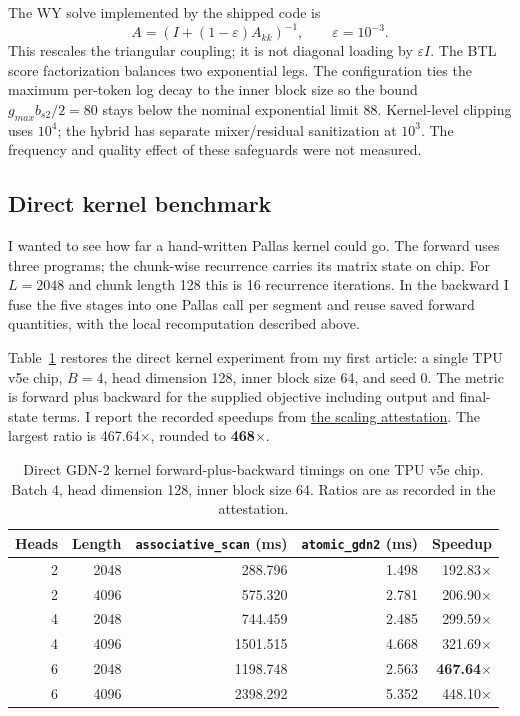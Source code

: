 \documentclass[10pt,a4paper]{article}
\begin{document}
The WY solve implemented by the shipped code is
\begin{equation}
 A=\left(I+(1-\varepsilon)A_{kk}\right)^{-1},\qquad \varepsilon=10^{-3}.
\end{equation}
This rescales the triangular coupling; it is not diagonal loading by $\varepsilon I$.
The BTL score factorization balances two exponential legs. The configuration ties the
maximum per-token log decay to the inner block size so the bound
$g_{max}b_{s2}/2=80$ stays below the nominal exponential limit 88.
Kernel-level clipping uses $10^4$; the hybrid has separate mixer/residual sanitization
at $10^3$. The frequency and quality effect of these safeguards were not measured.

\subsection{Direct kernel benchmark}
I wanted to see how far a hand-written Pallas kernel could go. The forward uses three
programs; the chunk-wise recurrence carries its matrix state on chip. For $L=2048$ and
chunk length 128 this is 16 recurrence iterations. In the backward I fuse the five stages
into one Pallas call per segment and reuse saved forward quantities, with the local
recomputation described above.

Table~\ref{tab:kernel-speed} restores the direct kernel experiment from my first article:
a single TPU v5e chip, $B=4$, head dimension 128, inner block size 64, and seed 0.
The metric is forward plus backward for the supplied objective including output and
final-state terms. I report the recorded speedups from
\href{https://github.com/Akseleu-J/atomic-ops/blob/0dbc59cf74883315d7adbebe9229c520663e0d58/attestation/scaling.json}{the scaling attestation}.
The largest ratio is 467.64$\times$, rounded to \textbf{468$\times$}.

\begin{table}[htbp]\centering\small
\caption{Direct GDN-2 kernel forward-plus-backward timings on one TPU v5e chip.
Batch 4, head dimension 128, inner block size 64. Ratios are as recorded in the attestation.}
\label{tab:kernel-speed}
\begin{tabular}{rrrrr}\toprule
Heads&Length&\texttt{associative\_scan} (ms)&\texttt{atomic\_gdn2} (ms)&Speedup\\\midrule
2&2048&288.796&1.498&192.83$\times$\\
2&4096&575.320&2.781&206.90$\times$\\
4&2048&744.459&2.485&299.59$\times$\\
4&4096&1501.515&4.668&321.69$\times$\\
6&2048&1198.748&2.563&\textbf{467.64$\times$}\\
6&4096&2398.292&5.352&448.10$\times$\\\bottomrule
\end{tabular}\end{table}
\end{document}
